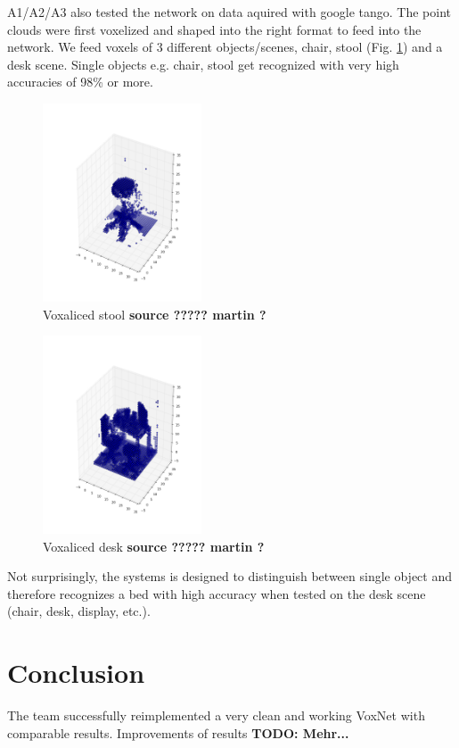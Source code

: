 \documentclass[10pt,twocolumn,letterpaper]{article}
\begin{document}
\vspace{0.3cm}
A1/A2/A3 also tested the network on data aquired with google tango. The point clouds were first voxelized
and shaped into the right format to feed into the network. We feed voxels of 3 different objects/scenes, chair, 
stool (Fig. \ref{fig:voxel_stool}) and a desk scene. Single objects e.g. chair, stool get recognized with very high accuracies of 98\% or more.

\begin{figure}[h]
	\label{fig:voxel_stool}
	\centering
	\includegraphics[width=0.42\textwidth]{figures/tango_voxel_stool}
	\caption{Voxaliced stool \textbf{ source ????? martin ?}}
\end{figure}


\begin{figure}[h]
	\label{fig:voxel_desk}
	\centering
	\includegraphics[width=0.42\textwidth]{figures/tango_voxel_desk_scene}
	\caption{Voxaliced desk \textbf{source ????? martin ?}}
\end{figure}

Not surprisingly, the systems is designed to distinguish between single object and therefore recognizes a bed with high accuracy when
tested on the desk scene (chair, desk, display, etc.).

\section{Conclusion}

The team successfully reimplemented a very clean and working VoxNet with comparable results.
Improvements of results 
\textbf{TODO: Mehr...}

{\small


}
\end{document}
